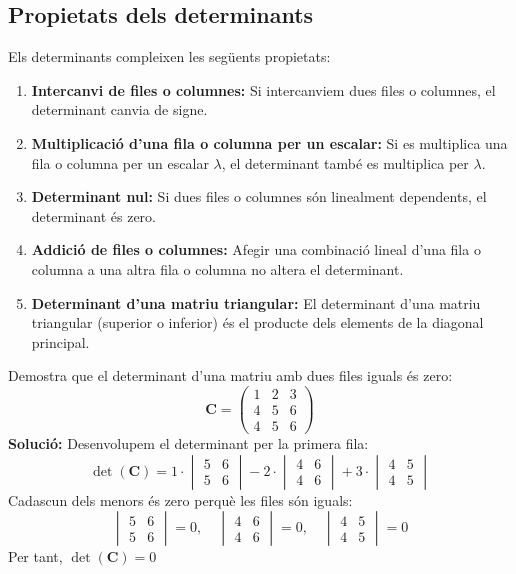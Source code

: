 \documentclass[12pt]{article}
\newcommand{\mat}[1]{\mathbf{#1}}
\begin{document}
\subsection{Propietats dels determinants}
\begin{concept}
Els determinants compleixen les següents propietats:
\begin{enumerate}
    \item \textbf{Intercanvi de files o columnes:} Si intercanviem dues files o columnes, el determinant canvia de signe.
    \item \textbf{Multiplicació d'una fila o columna per un escalar:} Si es multiplica una fila o columna per un escalar $\lambda$, el determinant també es multiplica per $\lambda$.
    \item \textbf{Determinant nul:} Si dues files o columnes són linealment dependents, el determinant és zero.
    \item \textbf{Addició de files o columnes:} Afegir una combinació lineal d'una fila o columna a una altra fila o columna no altera el determinant.
    \item \textbf{Determinant d'una matriu triangular:} El determinant d'una matriu triangular (superior o inferior) és el producte dels elements de la diagonal principal.
\end{enumerate}
\end{concept}

\begin{exemple}
Demostra que el determinant d'una matriu amb dues files iguals és zero:
\[
\mat{C} = \begin{pmatrix}
1 & 2 & 3 \\
4 & 5 & 6 \\
4 & 5 & 6
\end{pmatrix}
\]
\textbf{Solució:} Desenvolupem el determinant per la primera fila:
\[
\det(\mat{C}) = 1 \cdot \begin{vmatrix}
5 & 6 \\
5 & 6
\end{vmatrix} - 2 \cdot \begin{vmatrix}
4 & 6 \\
4 & 6
\end{vmatrix} + 3 \cdot \begin{vmatrix}
4 & 5 \\
4 & 5
\end{vmatrix}
\]
Cadascun dels menors és zero perquè les files són iguals:
\[
\begin{vmatrix}
5 & 6 \\
5 & 6
\end{vmatrix} = 0, \quad \begin{vmatrix}
4 & 6 \\
4 & 6
\end{vmatrix} = 0, \quad \begin{vmatrix}
4 & 5 \\
4 & 5
\end{vmatrix} = 0
\]
Per tant, $\det(\mat{C}) = 0$
\end{exemple}
\end{document}
